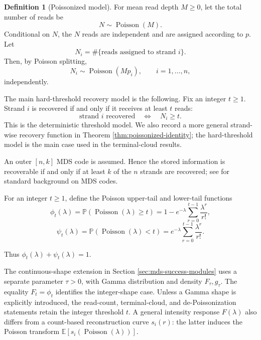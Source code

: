 \documentclass[11pt]{article}
\theoremstyle{definition}
\newtheorem{definition}{Definition}
\theoremstyle{remark}
\DeclareMathOperator{\Poisson}{Poisson}
\newcommand{\E}{\mathbb E}
\newcommand{\Pbb}{\mathbb P}
\newcommand{\1}{\mathbf 1}
\begin{document}
\begin{definition}[Poissonized model]
For mean read depth \(M\ge 0\), let the total number of reads be
\[
  N\sim \Poisson(M).
\]
Conditional on \(N\), the \(N\) reads are independent and are assigned according to \(p\).  Let
\[
  N_i=\#\{\text{reads assigned to strand }i\}.
\]
Then, by Poisson splitting,
\[
  N_i\sim \Poisson(Mp_i),\qquad i=1,\ldots,n,
\]
independently.
\end{definition}

The main hard-threshold recovery model is the following.  Fix an integer \(t\ge 1\).  Strand \(i\) is recovered if and only if it receives at least \(t\) reads:
\[
  \text{strand }i\text{ recovered}\quad \Longleftrightarrow\quad N_i\ge t.
\]
This is the deterministic threshold model.  We also record a more general strand-wise recovery function in Theorem \ref{thm:poissonized-identity}; the hard-threshold model is the main case used in the terminal-cloud results.

An outer \([n,k]\) MDS code is assumed.  Hence the stored information is recoverable if and only if at least \(k\) of the \(n\) strands are recovered; see \cite{MacWilliamsSloane1977} for standard background on MDS codes.

For an integer \(t\ge1\), define the Poisson upper-tail and lower-tail functions
\[
  \phi_t(\lambda)
  =\Pbb(\Poisson(\lambda)\ge t)
  =1-e^{-\lambda}\sum_{r=0}^{t-1}\frac{\lambda^r}{r!},
\]
\[
  \psi_t(\lambda)
  =\Pbb(\Poisson(\lambda)<t)
  =e^{-\lambda}\sum_{r=0}^{t-1}\frac{\lambda^r}{r!}.
\]

Thus \(\phi_t(\lambda)+\psi_t(\lambda)=1\).

The continuous-shape extension in Section \ref{sec:mds-success-modules} uses a separate parameter \(\tau>0\), with Gamma distribution and density \(F_\tau,g_\tau\). The equality \(F_t=\phi_t\) identifies the integer-shape case. Unless a Gamma shape is explicitly introduced, the read-count, terminal-cloud, and de-Poissonization statements retain the integer threshold \(t\). A general intensity response \(F(\lambda)\) also differs from a count-based reconstruction curve \(s_i(r)\): the latter induces the Poisson transform \(\E[s_i(\Poisson(\lambda))]\).
\end{document}
